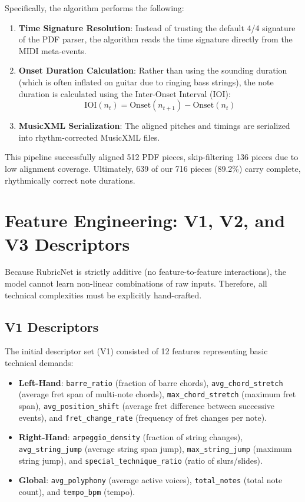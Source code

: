 Specifically, the algorithm performs the following:
\begin{enumerate}
    \item \textbf{Time Signature Resolution}: Instead of trusting the default 4/4 signature of the PDF parser, the algorithm reads the time signature directly from the MIDI meta-events.
    \item \textbf{Onset Duration Calculation}: Rather than using the sounding duration (which is often inflated on guitar due to ringing bass strings), the note duration is calculated using the Inter-Onset Interval (IOI):
    \begin{equation}
        \text{IOI}(n_t) = \text{Onset}(n_{t+1}) - \text{Onset}(n_t)
    \end{equation}
    \item \textbf{MusicXML Serialization}: The aligned pitches and timings are serialized into rhythm-corrected MusicXML files.
\end{enumerate}
This pipeline successfully aligned 512 PDF pieces, skip-filtering 136 pieces due to low alignment coverage. Ultimately, 639 of our 716 pieces (89.2\%) carry complete, rhythmically correct note durations.

\section{Feature Engineering: V1, V2, and V3 Descriptors}
Because RubricNet is strictly additive (no feature-to-feature interactions), the model cannot learn non-linear combinations of raw inputs. Therefore, all technical complexities must be explicitly hand-crafted.

\subsection{V1 Descriptors}
The initial descriptor set (V1) consisted of 12 features representing basic technical demands:
\begin{itemize}
    \item \textbf{Left-Hand}: \texttt{barre\_ratio} (fraction of barre chords), \texttt{avg\_chord\_stretch} (average fret span of multi-note chords), \texttt{max\_chord\_stretch} (maximum fret span), \texttt{avg\_position\_shift} (average fret difference between successive events), and \texttt{fret\_change\_rate} (frequency of fret changes per note).
    \item \textbf{Right-Hand}: \texttt{arpeggio\_density} (fraction of string changes), \texttt{avg\_string\_jump} (average string span jump), \texttt{max\_string\_jump} (maximum string jump), and \texttt{special\_technique\_ratio} (ratio of slurs/slides).
    \item \textbf{Global}: \texttt{avg\_polyphony} (average active voices), \texttt{total\_notes} (total note count), and \texttt{tempo\_bpm} (tempo).
\end{itemize}

